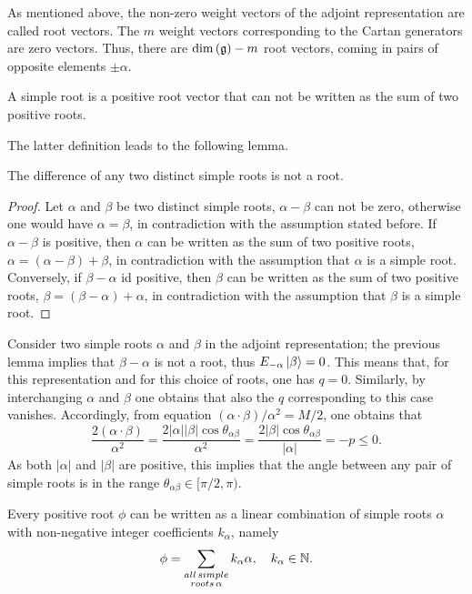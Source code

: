 As mentioned above, the non-zero weight vectors of the adjoint representation are called root vectors. The $m$ weight vectors corresponding to the Cartan generators are zero vectors. Thus, there are $\dim{(\mathfrak{g})} - m$ root vectors, coming in pairs of opposite elements $\pm \alpha$.
\begin{defn}
    A simple root is a positive root vector that can not be written as the sum of two positive roots.
\end{defn}
The latter definition leads to the following lemma.
\begin{lem}
    The difference of any two distinct simple roots is not a root.
\end{lem}
\begin{proof}
    Let $\alpha$ and $\beta$ be two distinct simple roots, $\alpha - \beta$ can not be zero, otherwise one would have $\alpha = \beta$, in contradiction with the assumption stated before. If $\alpha - \beta$ is positive, then $\alpha$ can be written as the sum of two positive roots, $\alpha = (\alpha - \beta) + \beta$, in contradiction with the assumption that $\alpha$ is a simple root. Conversely, if $\beta - \alpha$ id positive, then $\beta$ can be written as the sum of two positive roots, $\beta = (\beta - \alpha) + \alpha$, in contradiction with the assumption that $\beta$ is a simple root.  
\end{proof}
Consider two simple roots $\alpha$ and $\beta$ in the adjoint representation; the previous lemma implies that $\beta - \alpha$ is not a root, thus $E_{-\alpha}\ket{\beta} = 0$. This means that, for this representation and for this choice of roots, one has $q = 0$. Similarly, by interchanging $\alpha$ and $\beta$ one obtains that also the $q$ corresponding to this case vanishes. Accordingly, from equation $(\alpha \cdot \beta)/\alpha^2 = M/2$, one obtains that 
\begin{equation}
    \frac{2(\alpha \cdot \beta)}{\alpha^2} = \frac{2|\alpha||\beta|\cos{\theta_{\alpha\beta}}}{\alpha^2} = \frac{2|\beta|\cos{\theta_{\alpha\beta}}}{|\alpha|} = -p \le 0. 
\end{equation}
As both $|\alpha|$ and $|\beta|$ are positive, this implies that the angle between any pair of simple roots is in the range $\theta_{\alpha\beta} \in [\pi/2, \pi)$. 
\begin{lem}
    Every positive root $\phi$ can be written as a linear combination of simple roots $\alpha$ with non-negative integer coefficients $k_\alpha$, namely
    \begin{equation}
        \phi = \sum_{\substack{all\,simple \\
        roots\,\alpha}} k_\alpha\alpha,\quad k_\alpha \in \mathbb{N}.
    \end{equation}
\end{lem}
